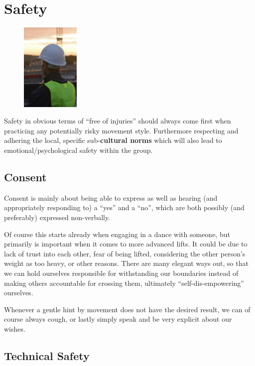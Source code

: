 \section{Safety}\label{sec:safety}

\begin{figure}
    \centering
    \includegraphics[width=0.25\textwidth]{images/safety}
\end{figure}

Safety in obvious terms of ``free of injuries'' should always come first when practicing any potentially risky movement style.
Furthermore respecting and adhering the local, specific sub-\textbf{cultural norms} which will also lead to emotional/psychological safety within the group.

\subsection{Consent}\label{subsec:consent}

Consent is mainly about being able to express as well as hearing (and appropriately responding to) a ``yes'' and a ``no'', which are both possibly (and preferably) expressed non-verbally.

Of course this starts already when engaging in a dance with someone, but primarily is important when it comes to more advanced lifts.
It could be due to lack of trust into each other, fear of being lifted, considering the other person's weight as too heavy, or other reasons.
There are many elegant ways out, so that we can hold ourselves responsible for withstanding our boundaries instead of making others accountable for crossing them, ultimately ``self-dis-empowering'' ourselves.

Whenever a gentle hint by movement does not have the desired result, we can of course always cough, or lastly simply speak and be very explicit about our wishes.

\subsection{Technical Safety}\label{subsec:technical-safety}

